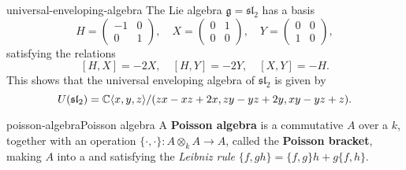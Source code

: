 \begin{example}{universal-enveloping-algebra}
    The Lie algebra $\mathfrak{g} = \mathfrak{sl}_2$ has a basis
    \[ H = \begin{pmatrix} -1 & 0 \\ 0 & 1 \end{pmatrix}, \quad X = \begin{pmatrix} 0 & 1 \\ 0 & 0 \end{pmatrix}, \quad Y = \begin{pmatrix} 0 & 0 \\ 1 & 0 \end{pmatrix} , \]
    satisfying the relations
    \[ [H, X] = -2X, \quad [H, Y] = -2Y, \quad [X, Y] = -H . \]
    This shows that the universal enveloping algebra of $\mathfrak{sl}_2$ is given by
    \[ U(\mathfrak{sl}_2) = \mathbb{C} \langle x, y, z \rangle / (zx - xz + 2x, zy - yz + 2y, xy - yz + z) . \]
\end{example}

\begin{topic}{poisson-algebra}{Poisson algebra}
    A \textbf{Poisson algebra} is a commutative  $A$ over a  $k$, together with an operation $\{ \cdot, \cdot \} : A \otimes_k A \to A$, called the \textbf{Poisson bracket}, making $A$ into a  and satisfying the \textit{Leibniz rule} $\{ f, gh \} = \{ f, g \} h + g \{ f, h \}$. %
\end{topic}
